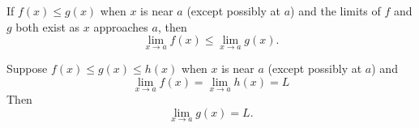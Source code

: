 \begin{frame}
\begin{theorem}
If $f(x) \leq g(x)$ when $x$ is near $a$ (except possibly at $a$) and the limits of $f$ and $g$ both exist as $x$ approaches $a$, then 
\[
\lim_{x\rightarrow a}f(x) \leq \lim_{x\rightarrow a} g(x).
\]
\end{theorem}
\begin{theorem}
Suppose $f(x) \leq g(x) \leq h(x)$ when $x$ is near $a$ (except possibly at $a$) and
\[
\lim_{x\rightarrow a} f(x) = \lim_{x\rightarrow a} h(x) = L
\]
Then
\[
\lim_{x\rightarrow a}g(x) = L.
\]
\end{theorem}
\end{frame}
